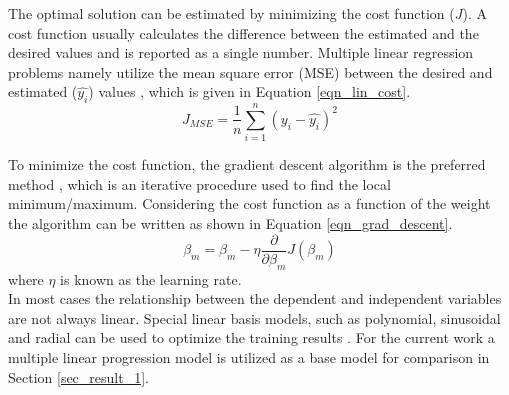 \documentclass[a4paper,fleqn]{cas-sc}
\begin{document}
The optimal solution can be estimated by minimizing the cost function ($J$). A cost function usually calculates the difference between the estimated and the desired values and is reported as a single number. Multiple linear regression problems namely utilize the mean square error (MSE) between the desired and estimated ($\hat{y_i}$)  values \cite{Wheeler2019}, which is given in Equation \ref{eqn_lin_cost}.
 \begin{equation}\label{eqn_lin_cost}
J_{MSE}=\frac{1}{n}\sum^n_{i=1}(y_i-\hat{y_i})^2
\end{equation} 

To minimize the cost function, the gradient descent algorithm is the preferred method \cite{Wen2022}, which is an iterative procedure used to find the local minimum/maximum. Considering the cost function as a function of the weight the algorithm can be written as shown in Equation \ref{eqn_grad_descent}.  
\begin{equation}\label{eqn_grad_descent}
\beta_{m} = \beta_m-\eta\frac{\partial}{\partial\beta_m}J(\beta_m)
\end{equation}
where $\eta$ is known as the learning rate.\\

In most cases the relationship between the dependent and independent variables are not always linear. Special linear basis models, such as polynomial, sinusoidal and radial can be used to optimize the training results \cite{Rasmussen2006}. For the current work a multiple linear progression model is utilized as a base model for comparison in Section \ref{sec_result_1}. 
\end{document}

